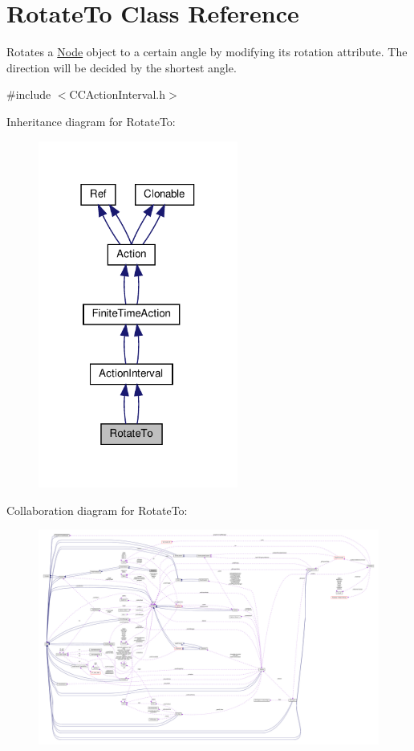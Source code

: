 \hypertarget{classRotateTo}{}\section{Rotate\+To Class Reference}
\label{classRotateTo}


Rotates a \hyperlink{classNode}{Node} object to a certain angle by modifying it\textquotesingle{}s rotation attribute. The direction will be decided by the shortest angle.  




{\ttfamily \#include $<$C\+C\+Action\+Interval.\+h$>$}



Inheritance diagram for Rotate\+To\+:
\nopagebreak
\begin{figure}[H]
\begin{center}
\leavevmode
\includegraphics[width=186pt]{classRotateTo__inherit__graph}
\end{center}
\end{figure}


Collaboration diagram for Rotate\+To\+:
\nopagebreak
\begin{figure}[H]
\begin{center}
\leavevmode
\includegraphics[width=350pt]{classRotateTo__coll__graph}
\end{center}
\end{figure}
